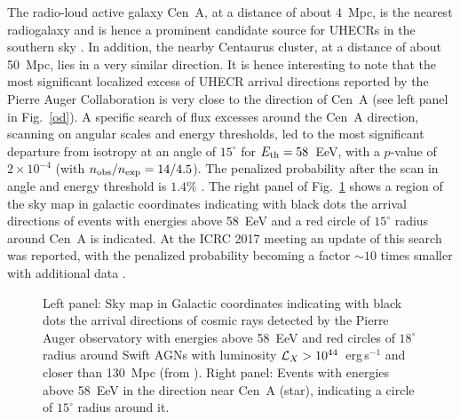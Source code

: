 \documentclass[twoside,12pt]{article}
\begin{document}
The radio-loud active galaxy Cen~A, at a distance of about 4~Mpc, is the nearest radiogalaxy and is hence a prominent candidate source for
UHECRs in the southern sky \cite{ro96}. In addition, the nearby Centaurus cluster, at a distance of about 50~Mpc,  lies in a very similar direction. It is hence interesting to note that the most significant localized excess of UHECR
arrival directions reported by the Pierre Auger
Collaboration \cite{SS15} is very close to the direction of Cen~A (see left panel in Fig.~\ref{od}). A specific search of flux excesses around the Cen~A direction, scanning on angular scales and energy thresholds, led to the most significant departure from isotropy at an angle of $15^\circ$  for $E_{\rm th} = 58$~EeV, with a $p$-value of $2 \times 10^{-4}$ (with $n_{\rm obs}/n_{\rm exp} = 14/4.5$). The penalized probability after the scan in angle and energy threshold is $1.4\%$ \cite{SS15}. The right panel of Fig.~\ref{swiftagn} shows a region of the sky map in galactic coordinates indicating with black dots the arrival directions of events with energies above 58~EeV and a red circle of $15^\circ$ radius around Cen~A is indicated.  At the ICRC 2017 meeting an update of this search was reported, with the penalized probability becoming a factor $\sim 10$ times smaller with additional data \cite{icrc17ugo}.

\begin{figure}
\begin{center}
\begin{minipage}[t]{8 cm}
\centerline{}
\end{minipage}
\begin{minipage}[t]{16.5 cm}
\caption{Left panel: Sky map in Galactic coordinates indicating with black dots the arrival directions of cosmic rays detected by the Pierre Auger observatory with energies above 58~EeV and red circles of $18^\circ$ radius around Swift AGNs with luminosity ${\cal L}_X  > 10^{44}$~erg\,s$^{-1}$ and closer than 130~Mpc (from \cite{SS15}). Right panel: Events with energies above 58~EeV in the direction near Cen~A (star), indicating a circle of $15^\circ$ radius around it.\label{swiftagn}}
\end{minipage}
\end{center}
\end{figure}
\end{document}
